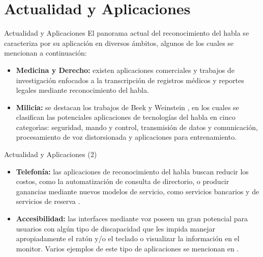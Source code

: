 \section{Actualidad y Aplicaciones}

\begin{frame}{Actualidad y Aplicaciones}
El panorama actual del reconocimiento del habla se caracteriza por su aplicaci\'on
en diversos \'ambitos, algunos de los cuales se mencionan a continuaci\'on:

\begin{itemize}
	\item{\textbf{Medicina y Derecho:}}
    existen aplicaciones comerciales y trabajos de investigaci\'on enfocados a la transcripci\'on de registros 
    m\'edicos \cite{LaiMedSpeak1997, USATodayHospitals} y reportes legales \cite{FalavignaAutomatic2009, NuanceLegal}
	mediante reconocimiento del habla.

	\item{\textbf{Milicia:}}
	se destacan los trabajos de Beek \cite{BeekAn1977} y Weinstein \cite{WeinsteinOpportunities1991},
	en los cuales se clasifican las potenciales aplicaciones de tecnolog\'ias del habla en 
	cinco categor{\'\i}as: seguridad, mando y control, transmisi\'on de datos y comunicaci\'on, 
	procesamiento de voz distorsionada y aplicaciones para entrenamiento.
\end{itemize}
\end{frame}
\begin{frame}{Actualidad y Aplicaciones (2)}
\begin{itemize}
	\item{\textbf{Telefon\'ia:}}
	las aplicaciones de reconocimiento del habla buscan reducir los costos, como
	la automatizaci\'on de consulta de directorio, 
	o producir ganancias mediante nuevos modelos de servicio, como servicios bancarios
	y de servicios de reserva \cite{RabinerApplications1997}.

	\item{\textbf{Accesibilidad:}}
	las interfaces mediante voz poseen un gran potencial para usuarios con alg\'un tipo de discapacidad
	que les impida manejar apropiadamente el rat\'on y/o el teclado o visualizar la informaci\'on en el monitor.
	Varios ejemplos de este tipo de aplicaciones se mencionan en \cite{AnanthiSurvey2013}.
\end{itemize}
\end{frame}
